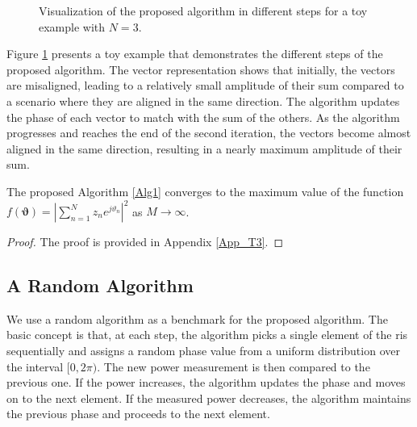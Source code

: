\documentclass[conference]{IEEEtran}
\begin{document}
\begin{figure}
    \hspace{-15.7mm}
    \scalebox{0.85}{}
    \caption{Visualization of the proposed algorithm in different steps for a toy example with $N=3$.}
    \label{fig:Visualization_Alg}
\end{figure}

Figure \ref{fig:Visualization_Alg} presents a toy example that demonstrates the different steps of the proposed algorithm. The vector representation shows that initially, the vectors are misaligned, leading to a relatively small amplitude of their sum compared to a scenario where they are aligned in the same direction. The algorithm updates the phase of each vector to match with the sum of the others. As the algorithm progresses and reaches the end of the second iteration, the vectors become almost aligned in the same direction, resulting in a nearly maximum amplitude of their sum.



\begin{thm}\label{Theorem_3}
The proposed Algorithm \ref{Alg1} converges to the maximum value of the function $f{\left(\bm{\vartheta}\right)}=\left|\sum_{n=1}^{N} z_{n}e^{j\vartheta_{n}}\right|^{2}$ as $M\to\infty$. 
\end{thm}
\begin{proof}
The proof is provided in Appendix \ref{App_T3}.
\end{proof}


\subsection{A Random Algorithm}
We use a random algorithm as a benchmark for the proposed algorithm. The basic concept is that, at each step, the algorithm picks a single element of the \gls*{ris} sequentially and assigns a random phase value from a uniform distribution over the interval $[0, 2\pi)$. The new power measurement is then compared to the previous one. If the power increases, the algorithm updates the phase and moves on to the next element. If the measured power decreases, the algorithm maintains the previous phase and proceeds to the next element.


\end{document}

